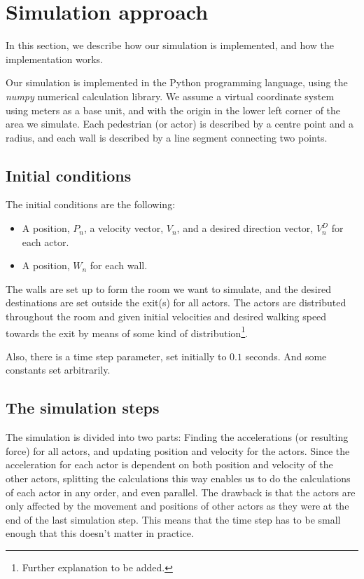 \section{Simulation approach}
In this section, we describe how our simulation is implemented, and how the 
implementation works.

Our simulation is implemented in the Python programming language, using the 
\emph{numpy} numerical calculation library. We assume a virtual coordinate 
system using meters as a base unit, and with the origin in the lower left 
corner of the area we simulate. Each pedestrian (or actor) is described by a 
centre point and a radius, and each wall is described by a line segment 
connecting two points.

\subsection{Initial conditions}
The initial conditions are the following:

\begin{itemize}
    \item A position, $P_n$, a velocity vector, $V_n$, and a desired direction 
        vector, $V^D_{n}$ for each actor.
    \item A position, $W_n$ for each wall.
\end{itemize}

The walls are set up to form the room we want to simulate, and the desired 
destinations are set outside the exit(s) for all actors. The actors are 
distributed throughout the room and given initial velocities and desired 
walking speed towards the exit by means of some kind of 
distribution\footnote{Further explanation to be added.}.

Also, there is a time step parameter, set initially to $0.1$ seconds. And some 
constants set arbitrarily.

\subsection{The simulation steps}
The simulation is divided into two parts: Finding the accelerations (or 
resulting force) for all actors, and updating position and velocity for the 
actors.  Since the acceleration for each actor is dependent on both position 
and velocity of the other actors, splitting the calculations this way enables 
us to do the calculations of each actor in any order, and even parallel. The 
drawback is that the actors are only affected by the movement and positions of 
other actors as they were at the end of the last simulation step. This means 
that the time step has to be small enough that this doesn't matter in 
practice.

